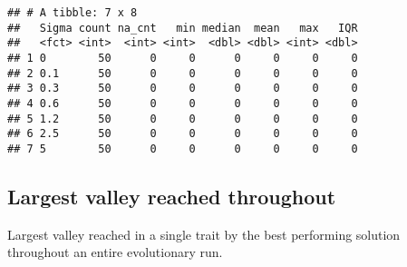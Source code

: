 \documentclass[]{book}
\begin{document}
\begin{verbatim}
## # A tibble: 7 x 8
##   Sigma count na_cnt   min median  mean   max   IQR
##   <fct> <int>  <int> <int>  <dbl> <dbl> <int> <dbl>
## 1 0        50      0     0      0     0     0     0
## 2 0.1      50      0     0      0     0     0     0
## 3 0.3      50      0     0      0     0     0     0
## 4 0.6      50      0     0      0     0     0     0
## 5 1.2      50      0     0      0     0     0     0
## 6 2.5      50      0     0      0     0     0     0
## 7 5        50      0     0      0     0     0     0
\end{verbatim}

\hypertarget{largest-valley-reached-throughout-10}{%
\subsection{Largest valley reached throughout}\label{largest-valley-reached-throughout-10}}

Largest valley reached in a single trait by the best performing solution throughout an entire evolutionary run.
\end{document}
